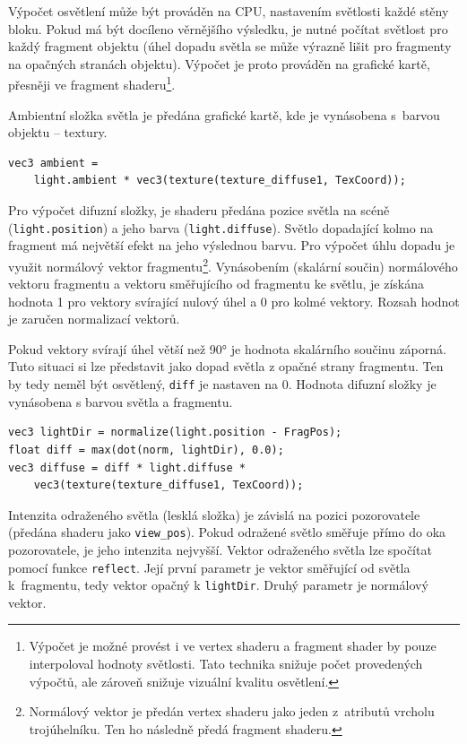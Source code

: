 \documentclass[thesis=M,czech]{FITthesis}[2019/12/23]
\begin{document}
Výpočet osvětlení může být prováděn na CPU, nastavením světlosti každé stěny bloku. Pokud má být docíleno věrnějšího výsledku, je nutné počítat světlost pro každý fragment objektu (úhel dopadu světla se může výrazně lišit pro fragmenty na opačných stranách objektu). Výpočet je proto prováděn na grafické kartě, přesněji ve fragment shaderu\footnote{Výpočet je možné provést i ve vertex shaderu a fragment shader by pouze interpoloval hodnoty světlosti. Tato technika snižuje počet provedených výpočtů, ale zároveň snižuje vizuální kvalitu osvětlení.}.

Ambientní složka světla je předána grafické kartě, kde je vynásobena s~barvou objektu -- textury.

\begin{verbatim}
vec3 ambient = 
    light.ambient * vec3(texture(texture_diffuse1, TexCoord));
\end{verbatim}

Pro výpočet difuzní složky, je shaderu předána pozice světla na scéně (\texttt{light.position}) a jeho barva (\texttt{light.diffuse}). Světlo dopadající kolmo na fragment má nej\-vět\-ší efekt na jeho výslednou barvu. Pro výpočet úhlu dopadu je využit normálový vektor fragmentu\footnote{Normálový vektor je předán vertex shaderu jako jeden z~atributů vrcholu trojúhelníku. Ten ho následně předá fragment shaderu.}. Vynásobením (skalární součin) normálového vektoru fragmentu a vektoru směřujícího od fragmentu ke světlu, je získána hodnota 1 pro vektory svírající nulový úhel a 0 pro kolmé vektory. Rozsah hodnot je zaručen normalizací vektorů.

Pokud vektory svírají úhel větší než 90° je hodnota skalárního součinu záporná. Tuto situaci si lze představit jako dopad světla z opačné strany fragmentu. Ten by tedy neměl být osvětlený, \texttt{diff} je nastaven na 0. Hodnota difuzní složky je vynásobena s barvou světla a fragmentu.

\begin{verbatim}
vec3 lightDir = normalize(light.position - FragPos);
float diff = max(dot(norm, lightDir), 0.0);
vec3 diffuse = diff * light.diffuse * 
    vec3(texture(texture_diffuse1, TexCoord));
\end{verbatim}

Intenzita odraženého světla (lesklá složka) je závislá na pozici pozorovatele (předána shaderu jako \texttt{view\_pos}). Pokud odražené světlo směřuje přímo do oka pozorovatele, je jeho intenzita nejvyšší. Vektor odraženého světla lze spočítat pomocí funkce \texttt{reflect}. Její první parametr je vektor směřující od světla k~fragmentu, tedy vektor opačný k \texttt{lightDir}. Druhý parametr je nor\-mál\-ový vektor.
\end{document}
